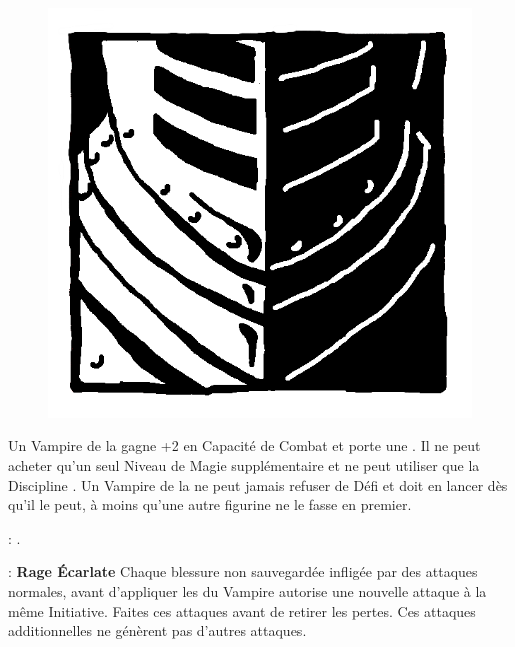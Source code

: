 \begin{figure}
\centering
\includegraphics[width=\logosize]{logos/logo_brotherhood.png}
\end{figure}
Un Vampire de la \brotherhood{} gagne +2 en Capacité de Combat et porte une \platearmour{}. Il ne peut acheter qu'un seul Niveau de Magie supplémentaire et ne peut utiliser que la Discipline \necromancy{}. Un Vampire de la \brotherhood{} ne peut jamais refuser de Défi et doit en lancer dès qu'il le peut, à moins qu'une autre figurine ne le fasse en premier.

\vspace{0.5cm}
\bloodtie{} : \textbf{\vampireknights{}}.

\vspace{0.5cm}
\ancientbloodpower{} : \textbf{Rage Écarlate}\dotfill{}\newline%
Chaque blessure non sauvegardée infligée par des attaques normales, avant d'appliquer les \multiplewounds{}{} du Vampire autorise une nouvelle attaque à la même Initiative. Faites ces attaques avant de retirer les pertes. Ces attaques additionnelles ne génèrent pas d'autres attaques.


